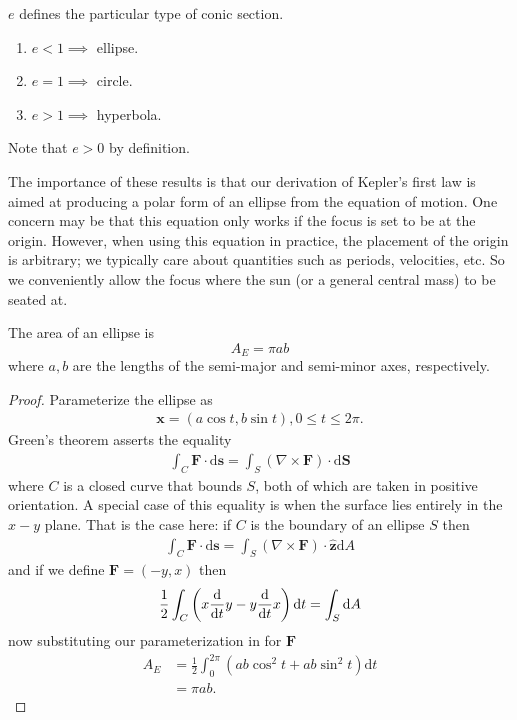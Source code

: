 \begin{corollary}\label{ecc}
$e$ defines the particular type of conic section. 
\begin{enumerate}
    \item $e < 1 \implies $ ellipse. 
    \item $e = 1 \implies $ circle. 
    \item $e > 1 \implies $ hyperbola. 
\end{enumerate}
Note that $e > 0$ by definition. 
\end{corollary}
The importance of these results is that our derivation of Kepler's first law is aimed at producing a polar form of an ellipse from the equation of motion. One concern may be that this equation only works if the focus is set to be at the origin. However, when using this equation in practice, the placement of the origin is arbitrary; we typically care about quantities such as periods, velocities, etc. So we conveniently allow the focus where the sun (or a general central mass) to be seated at. 
\begin{theorem}\label{areaofellipse}
The area of an ellipse is \begin{equation}
    A_E = \pi ab
\end{equation}
where $a, b$ are the lengths of the semi-major and semi-minor axes, respectively. 
\end{theorem}
\begin{proof}
Parameterize the ellipse as \begin{align}
    \bm x = \left(a\cos t, b\sin t\right), 0 \leq t \leq 2\pi.
\end{align}
Green's theorem asserts the equality
\begin{align}
    \int_C \bm F \cdot \mathrm{d}\bm s = \int_S \left(\nabla \times \bm F\right) \cdot \mathrm{d}\bm S 
\end{align}
where $C$ is a closed curve that bounds $S$, both of which are taken in positive orientation. A special case of this equality is when the surface lies entirely in the $x-y$ plane. That is the case here: if $C$ is the boundary of an ellipse $S$ then 
\begin{align}
    \int_C \bm F \cdot \mathrm{d}\bm s = \int_S \left(\nabla \times \bm F\right) \cdot \bm{\hat{z}} \mathrm{d}A 
\end{align}
and if we define $\bm{F} = (-y, x)$ then 
\begin{align}
    \frac{1}{2} \int_C \left(x\frac{\mathrm{d}}{\mathrm{d}t}{y} - y\frac{\mathrm{d}}{\mathrm{d}t}{x}\right) \mathrm{d}t = \int_S \mathrm{d}A 
\end{align}
now substituting our parameterization in for $\bm F$
\begin{align}
    A_E &= \frac{1}{2} \int_0^{2\pi} \left(ab\cos^2t + ab\sin^2t\right) \mathrm{d}t \\
    &= \pi ab.
\end{align}
\end{proof}

